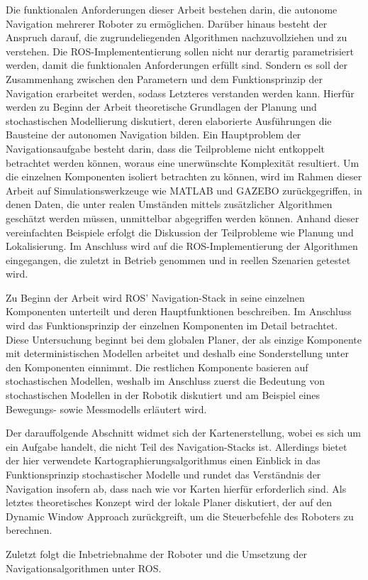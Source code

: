 Die funktionalen Anforderungen dieser Arbeit bestehen darin, die autonome Navigation mehrerer Roboter zu ermöglichen. Darüber hinaus besteht der Anspruch darauf, die zugrundeliegenden Algorithmen nachzuvollziehen und zu verstehen. Die ROS-Implemententierung sollen nicht nur derartig parametrisiert werden, damit die funktionalen Anforderungen erfüllt sind. Sondern es soll der Zusammenhang zwischen den Parametern und dem Funktionsprinzip der Navigation erarbeitet werden, sodass Letzteres verstanden werden kann. Hierfür werden zu Beginn der Arbeit theoretische Grundlagen der Planung und stochastischen Modellierung diskutiert, deren elaborierte Ausführungen die Bausteine der autonomen Navigation bilden.
Ein Hauptproblem der Navigationsaufgabe besteht darin, dass die Teilprobleme nicht entkoppelt betrachtet werden können, woraus eine unerwünschte Komplexität resultiert. Um die einzelnen Komponenten isoliert betrachten zu können, wird im Rahmen dieser Arbeit auf Simulationswerkzeuge wie MATLAB und GAZEBO zurückgegriffen, in denen Daten, die unter realen Umständen mittels zusätzlicher Algorithmen geschätzt werden müssen, unmittelbar abgegriffen werden können. Anhand dieser vereinfachten Beispiele erfolgt die Diskussion der Teilprobleme wie Planung und Lokalisierung. Im Anschluss wird auf die ROS-Implementierung der Algorithmen eingegangen, die zuletzt in Betrieb genommen und in reellen Szenarien getestet wird.

Zu Beginn der Arbeit wird ROS' Navigation-Stack in seine einzelnen Komponenten unterteilt und deren Hauptfunktionen beschreiben. Im Anschluss wird das Funktionsprinzip der einzelnen Komponenten im Detail betrachtet. Diese Untersuchung beginnt bei dem globalen Planer, der als einzige Komponente mit deterministischen Modellen arbeitet und deshalb eine Sonderstellung unter den Komponenten einnimmt. Die restlichen Komponente basieren auf stochastischen Modellen, weshalb im Anschluss zuerst die Bedeutung von stochastischen Modellen in der Robotik diskutiert und am Beispiel eines Bewegungs- sowie Messmodells erläutert wird.

Der darauffolgende Abschnitt widmet sich der Kartenerstellung, wobei es sich um ein Aufgabe handelt, die nicht Teil des Navigation-Stacks ist. Allerdings bietet der hier verwendete Kartographierungsalgorithmus einen Einblick in das Funktionsprinzip stochastischer Modelle und rundet das Verständnis der Navigation insofern ab, dass nach wie vor Karten hierfür erforderlich sind. Als letztes theoretisches Konzept wird der lokale Planer diskutiert, der auf den Dynamic Window Approach zurückgreift, um die Steuerbefehle des Roboters zu berechnen.

Zuletzt folgt die Inbetriebnahme der Roboter und die Umsetzung der Navigationsalgorithmen unter ROS.